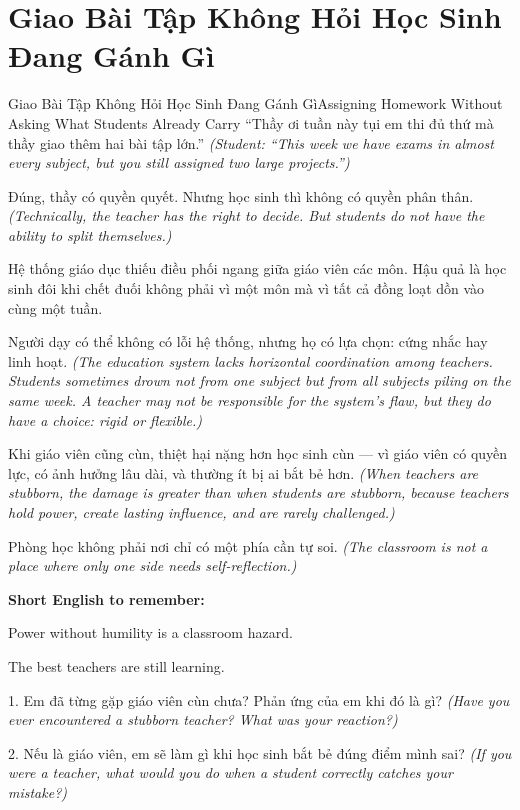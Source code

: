 \section{Giao Bài Tập Không Hỏi Học Sinh Đang Gánh Gì}
\begin{truyen}{Giao Bài Tập Không Hỏi Học Sinh Đang Gánh Gì}{Assigning Homework Without Asking What Students Already Carry}
 ``Thầy ơi tuần này tụi em thi đủ thứ mà thầy giao thêm hai bài tập lớn.''
\textit{(Student: ``This week we have exams in almost every subject, but you still assigned two large projects.'')}


Đúng, thầy có quyền quyết. Nhưng học sinh thì không có quyền phân thân.
\textit{(Technically, the teacher has the right to decide. But students do not have the ability to split themselves.)}

\begin{baihoc}
Hệ thống giáo dục thiếu điều phối ngang giữa giáo viên các môn. Hậu quả là học sinh đôi khi chết đuối không phải vì một môn mà vì tất cả đồng loạt dồn vào cùng một tuần.

Người dạy có thể không có lỗi hệ thống, nhưng họ có lựa chọn: cứng nhắc hay linh hoạt.
\textit{(The education system lacks horizontal coordination among teachers. Students sometimes drown not from one subject but from all subjects piling on the same week. A teacher may not be responsible for the system's flaw, but they do have a choice: rigid or flexible.)}
\end{baihoc}
\end{truyen}

\begin{baihoc}
Khi giáo viên cũng cùn, thiệt hại nặng hơn học sinh cùn --- vì giáo viên có quyền lực, có ảnh hưởng lâu dài, và thường ít bị ai bắt bẻ hơn.
\textit{(When teachers are stubborn, the damage is greater than when students are stubborn, because teachers hold power, create lasting influence, and are rarely challenged.)}

Phòng học không phải nơi chỉ có một phía cần tự soi.
\textit{(The classroom is not a place where only one side needs self-reflection.)}
\end{baihoc}

\begin{ghinhoanh}
\textbf{Short English to remember:}

Power without humility is a classroom hazard.

The best teachers are still learning.
\end{ghinhoanh}

\begin{tuhocnhanh}
1. Em đã từng gặp giáo viên cùn chưa? Phản ứng của em khi đó là gì? \textit{(Have you ever encountered a stubborn teacher? What was your reaction?)}

2. Nếu là giáo viên, em sẽ làm gì khi học sinh bắt bẻ đúng điểm mình sai? \textit{(If you were a teacher, what would you do when a student correctly catches your mistake?)}
\end{tuhocnhanh}

\ngancach
